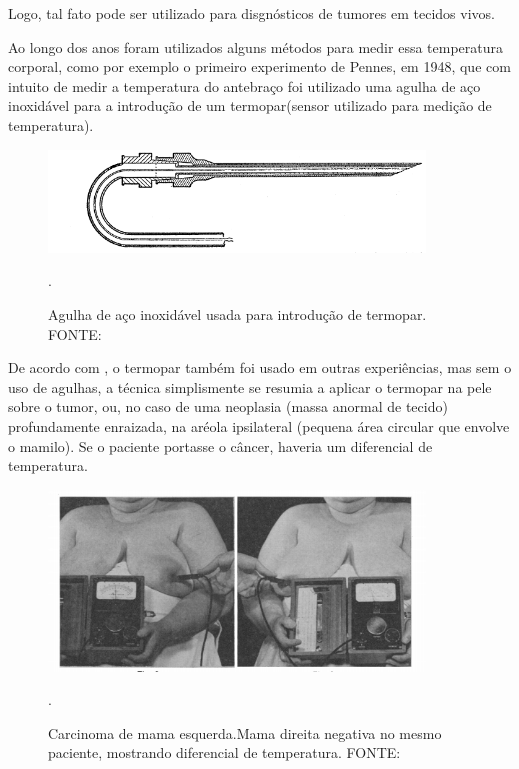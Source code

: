  Logo, tal fato pode ser utilizado para disgnósticos de tumores em tecidos vivos.
   

   
  
  Ao longo dos anos foram utilizados alguns métodos para medir essa  temperatura corporal, como por exemplo o primeiro experimento de Pennes, em 1948, que com intuito de medir a temperatura do antebraço  foi utilizado uma agulha de aço inoxidável para a introdução de um termopar(sensor utilizado para medição de temperatura).
 
 \begin{figure}[h]
\centering
\includegraphics[width=10cm]{figuras/agulha.png}
\caption{Agulha de aço inoxidável usada para introdução de termopar. FONTE: \cite{PENNES}}.
\label{figura 1:Agulha }
\end{figure}

De acordo com \cite{Lawson}, o termopar também foi usado em outras experiências, mas sem o uso de agulhas, a técnica simplismente se resumia a aplicar o termopar  na pele sobre o tumor, ou, no caso de uma neoplasia (massa anormal de tecido) profundamente enraizada, na aréola ipsilateral (pequena área circular que envolve o mamilo). Se o paciente portasse o câncer, haveria um diferencial de temperatura.
 
 
 \begin{figure}[h]
\centering
\includegraphics[width=10cm]{figuras/termopar_na_mama.png}
\caption{Carcinoma de mama esquerda.Mama direita negativa no mesmo paciente, mostrando
diferencial de temperatura. FONTE: \cite{Lawson}}.
\label{figura 2 :termopar na mama}
\end{figure}

